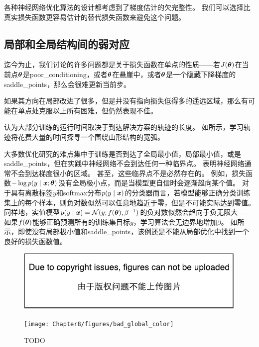 各种神经网络优化算法的设计都考虑到了梯度估计的欠完整性。
我们可以选择比真实损失函数更容易估计的替代损失函数来避免这个问题。

\subsection{局部和全局结构间的弱对应}
\label{sec:poor_correspondence_between_local_and_global_structure}
迄今为止，我们讨论的许多问题都是关于损失函数在单点的性质——若$J(\boldsymbol{\theta})$在当前点$\boldsymbol{\theta}$是\gls{poor_conditioning}，或者$\boldsymbol{\theta}$在悬崖中，或者$\boldsymbol{\theta}$是一个隐藏下降梯度的\gls{saddle_points}，那么会很难更新当前步。

如果其方向在局部改进了很多，但是并没有指向损失低得多的遥远区域，那么有可能在单点处克服以上所有困难，但仍然表现不佳。

\cite{GoodfellowOptimization15}认为大部分训练的运行时间取决于到达解决方案的轨迹的长度。 
如所示，学习轨迹将花费大量的时间探寻一个围绕山形结构的宽弧。

大多数优化研究的难点集中于训练是否到达了全局最小值，局部最小值，或是\gls{saddle_points}，但在实践中神经网络不会到达任何一种临界点。
表明神经网络通常不会到达梯度很小的区域。
甚至，这些临界点不是必然存在的。
例如，损失函数$-\log p(y\mid\boldsymbol{\mathit{x}};\boldsymbol{\theta})$没有全局极小点，而是当模型更自信时会逐渐趋向某个值。    
对于具有离散标签$y$和softmax分布$p(y\mid\boldsymbol{\mathit{x}})$的分类器而言，若模型能够正确分类训练集上的每个样本，则负对数似然可以任意地趋近于零，但是不可能实际达到零值。
同样地，实值模型$p(y\mid\boldsymbol{\mathit{x}}) = \mathcal{N}(y;f(\boldsymbol{\theta}),\beta^{-1})$的负对数似然会趋向于负无限大——如果$f(\boldsymbol{\theta})$能够正确预测所有的训练集目标$y$，学习算法会无边界地增加$\beta$。
如所示，即使没有局部极小值和\gls{saddle_points}，该例还是不能从局部优化中找到一个良好的损失函数值。

\begin{figure}[!htb]
\ifOpenSource
\centerline{\includegraphics{figure.pdf}}
\else
\centerline{\texttt{[image: Chapter8/figures/bad\_global\_color]}}
\fi
\caption{TODO}
\label{fig:chap8_bad_global}
\end{figure}


